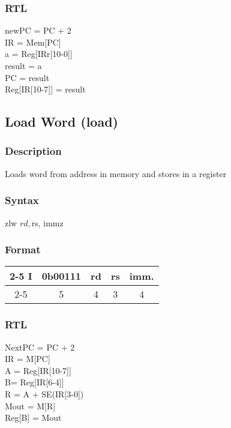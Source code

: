 \documentclass[12pt, a4paper]{report}
\begin{document}
	\subsubsection{RTL}
	newPC = PC + 2 \\
	IR = Mem[PC] \\
	a = Reg[IRr[10-0]] \\
	result = a \\
	PC = result \\
	Reg[IR[10-7]] = result \\
	
	\subsection{Load Word (load)}
	\subsubsection{Description}
	Loads word from address in memory and stores in a register
	\subsubsection{Syntax}
	zlw    $rd, $rs, immz %
	\subsubsection{Format}
	\begin{center}
		{\renewcommand{\arraystretch}{1.5}
			\begin{tabular}[b]{c @{ } c | c | c | c|}
				\cline{2-5}
				I & \vline \hspace{1.5pt} 0b00111 & rd & rs & imm. \\
				\cline{2-5}
				\multicolumn{1}{}{} & \multicolumn{1}{c}{5} & \multicolumn{1}{c}{4}
				& \multicolumn{1}{c}{3} & \multicolumn{1}{c}{4}
			\end{tabular}}
	\end{center}
	\subsubsection{RTL}
	NextPC = PC + 2 \\
	IR = M[PC] \\
	A = Reg[IR[10-7]] \\
	B= Reg[IR[6-4]] \\
	R = A + SE(IR[3-0]) \\
	Mout = M[R] \\
	Reg[B] = Mout \\
	
\end{document}
